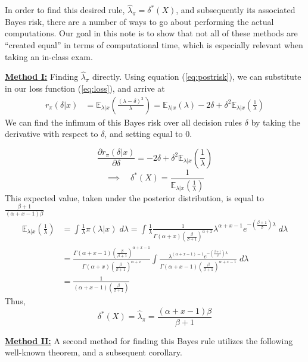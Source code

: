 \documentclass[11pt]{report}
\begin{document}
In order to find this desired rule, $\widehat{\lambda}_\pi = \delta^*(X)$, and subsequently its associated Bayes risk, there are a number of ways to go about performing the actual computations. Our goal in this note is to show that not all of these methods are ``created equal'' in terms of computational time, which is especially relevant when taking an in-class exam. \newline

 
\underline{\textbf{Method I:}} Finding $\widehat{\lambda}_\pi$ directly. \newline
Using equation (\ref{eq:postrisk}), we can substitute in our loss function (\ref{eq:loss}), and arrive at  
\begin{align*}
r_\pi(\delta|x) 
& = \mathbb{E}_{\lambda|x}\left(\frac{(\lambda-\delta)^2}{\lambda}\right )  = \mathbb{E}_{\lambda|x}\left(\lambda\right) - 2\delta + \delta^2\mathbb{E}_{\lambda|x}\left(\frac{1}{\lambda}\right ) 
\end{align*}
We can find the infimum of this Bayes risk over all decision rules $\delta$ by taking the derivative with respect to $\delta$, and setting equal to 0.
		
$$\frac{\partial r_\pi(\delta|x)}{\partial \delta} =  - 2\delta + \delta^2\mathbb{E}_{\lambda|x}\left(\frac{1}{\lambda} \right )$$
$$\implies \quad \delta^*(X) = \frac{1}{\mathbb{E}_{\lambda|x}\left(\frac{1}{\lambda} \right )}$$
This expected value, taken under the posterior distribution, is equal to $\frac{\beta+1}{(\alpha +x-1)\beta}$
\begin{align*}
\mathbb{E}_{\lambda|x}\left(\frac{1}{\lambda} \right) 
& = \int \frac{1}{\lambda} \pi(\lambda|x) \; d\lambda 
= \int \frac{1}{\lambda} \frac{1}{\Gamma(\alpha+x)\left(\frac{\beta}{\beta+1}\right)^{\alpha+x}}\lambda^{\alpha+x-1}e^{-(\frac{\beta+1}{\beta})\lambda} \; d\lambda \\
& = \frac{\Gamma(\alpha+x-1)\left(\frac{\beta}{\beta+1}\right)^{\alpha+x-1}}{\Gamma(\alpha+x)\left(\frac{\beta}{\beta+1}\right)^{\alpha+x}}\int\frac{\lambda^{(\alpha+x-1)-1}e^{-(\frac{\beta+1}{\beta})\lambda}}{\Gamma(\alpha+x-1)\left(\frac{\beta}{\beta+1}\right)^{\alpha+x-1}} \; d\lambda \\
& = \frac{1}{(\alpha+x-1)\left(\frac{\beta}{\beta+1}\right)}
\end{align*}		
Thus, 
$$\delta^*(X) = \widehat{\lambda}_\pi =\frac{(\alpha +x-1)\beta}{\beta+1} $$

\underline{\textbf{Method II:}} A second method for finding this Bayes rule utilizes the following well-known theorem, and a subsequent corollary. 
\end{document}
